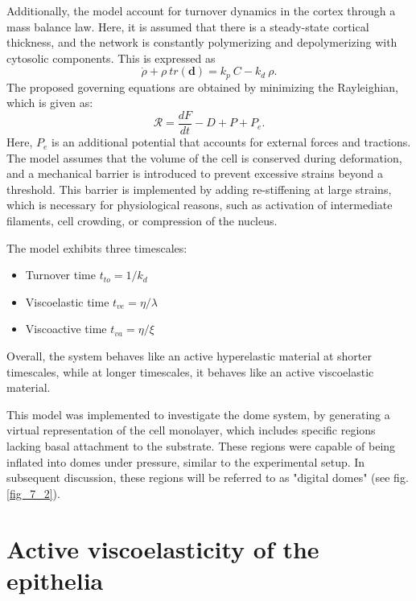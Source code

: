 Additionally, the model account for turnover dynamics in the cortex through a mass balance law. Here, it is assumed that there is a steady-state cortical thickness, and the network is constantly polymerizing and depolymerizing with cytosolic components. This is expressed as 
\begin{equation}
\dot{\rho} + \rho \ tr(\mathbf{d}) = k_p\ C - k_d\ \rho.
\end{equation}
The proposed governing equations are obtained by minimizing the Rayleighian, which is given as:
\begin{equation}
 \mathcal{R} = \frac{dF}{dt} - D + P + P_e .
\end{equation}
Here, $P_e$ is an additional potential that accounts for external forces and tractions. The model assumes that the volume of the cell is conserved during deformation, and a mechanical barrier is introduced to prevent excessive strains beyond a threshold. This barrier is implemented by adding re-stiffening at large strains, which is necessary for physiological reasons, such as activation of intermediate filaments, cell crowding, or compression of the nucleus.

The model exhibits three timescales: 

\begin{itemize}
	\item Turnover time $t_{to} = 1/k_d$
	\item Viscoelastic time $t_{ve} = \eta/\lambda$
	\item Viscoactive time $t_{va} = \eta/\xi$
\end{itemize}

Overall, the system behaves like an active hyperelastic material at shorter timescales, while at longer timescales, it behaves like an active viscoelastic material.

This model was implemented to investigate the dome system, by generating a virtual representation of the cell monolayer, which includes specific regions lacking basal attachment to the substrate. These regions were capable of being inflated into domes under pressure, similar to the experimental setup. In subsequent discussion, these regions will be referred to as "digital domes" (see fig. \ref{fig_7_2}).

\hypertarget{active-viscoelasticity-of-the-epithelia}{%
	\section{Active viscoelasticity of the
		epithelia}\label{active-viscoelasticity-of-the-epithelia}}
	
